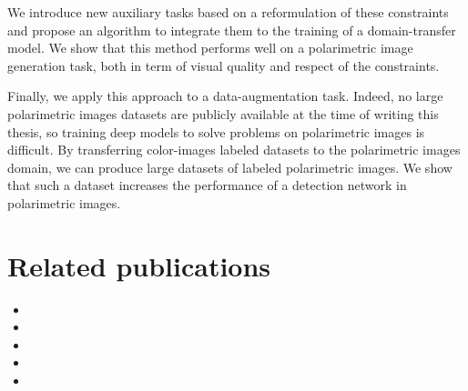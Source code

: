 We introduce new auxiliary tasks based on a reformulation of these constraints and propose an algorithm to integrate them to the training of a domain-transfer model. We show that this method performs well on a polarimetric image generation task, both in term of visual quality and respect of the constraints.

Finally, we apply this approach to a data-augmentation task. Indeed, no large polarimetric images datasets are publicly available at the time of writing this thesis, so training deep models to solve problems on polarimetric images is difficult. By transferring color-images labeled datasets to the polarimetric images domain, we can produce large datasets of labeled polarimetric images. We show that such a dataset increases the performance of a detection network in polarimetric images.


\section*{Related publications}

\begin{itemize}
	\item{}
	\item{}
	\item{}
	\item{}
	\item{}
\end{itemize}


\fancyhead[R]{}